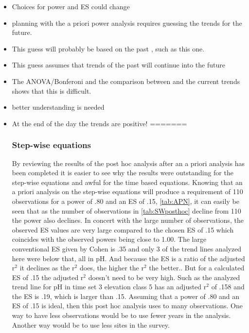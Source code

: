 \begin{itemize}
\begin{itemize}
	\end{itemize}
	\item Choices for power and ES could change
	\item planning with the a priori power analysis requires guessing the trends for the future.  %
	\item This guess will probably be based on the past , such as this one.
	\item This guess assumes that trends of the past will continue into the future
	\item The ANOVA/Bonferoni and the comparison between \citep{robinson2008ph} and the current trends shows that this is difficult.
	\item better understanding is needed
	\item At the end of the day the trends are positive!
=======

\subsubsection{Step-wise equations}

By reviewing the results of the post hoc analysis after an a priori analysis has been completed it is easier to see why the results were outstanding for the step-wise equations and awful for the time based equations.
Knowing that an a priori analysis on the step-wise equations will produce a requirement of 110 observations for a power of .80 and an ES of .15, \autoref{tab:APN}, it can easily be seen that as the number of observations in \autoref{tab:SWposthoc} decline from 110 the power also declines.
In concert with the large number of observations, the observed ES values are very large compared to the chosen ES of .15 which coincides with the observed powers being close to 1.00.
The large conventional ES given by Cohen is .35 and only 3 of the trend lines analyzed here were below that, all in pH.
And because the ES is a ratio of the adjusted r$^2$ it declines as the r$^2$ does, the higher the r$^2$ the better..
But for a calculated ES of .15 the adjusted r$^2$ doesn't need to be very high.
Such as the analyzed trend line for pH in time set 3 elevation class 5 has an adjusted r$^2$ of .158 and the ES is .19, which is larger than .15.
Assuming that a power of .80 and an ES of .15 is ideal, then this post hoc analysis uses to many observations.
One way to have less observations would be to use fewer years in the analysis.
Another way would be to use less sites in the survey.


\end{itemize}
